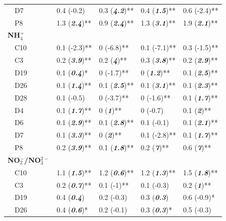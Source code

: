 \documentclass[journal = esthag, manuscript = article]{achemso}\usepackage[]{graphicx}\usepackage[]{color}
\begin{document}
\begin{table}[!tbp]
\begin{center}
\begin{tabular}{lllll}
~~D7&0.4 \footnotesize{(-0.2)}&0.3 \footnotesize{(\textit{\textbf{4.2}})**}&0.4 \footnotesize{(\textit{\textbf{1.5}})**}&0.6 \footnotesize{(-2.4)**}\tabularnewline
~~P8&1.3 \footnotesize{(\textit{\textbf{2.4}})**}&0.9 \footnotesize{(\textit{\textbf{2.4}})**}&1.3 \footnotesize{(\textit{\textbf{3.1}})**}&1.9 \footnotesize{(\textit{\textbf{2.1}})**}\tabularnewline
\hline
{\bfseries NH$_{4}^{+}$}&&&&\tabularnewline
~~C10&0.1 \footnotesize{(-2.3)**}&0 \footnotesize{(-6.8)**}&0.1 \footnotesize{(-7.1)**}&0.3 \footnotesize{(-1.5)**}\tabularnewline
~~C3&0.2 \footnotesize{(\textit{\textbf{3.9}})**}&0.2 \footnotesize{(\textit{\textbf{4}})**}&0.3 \footnotesize{(\textit{\textbf{3.8}})**}&0.2 \footnotesize{(\textit{\textbf{2.9}})**}\tabularnewline
~~D19&0.1 \footnotesize{(\textit{\textbf{0.4}})*}&0 \footnotesize{(-1.7)**}&0 \footnotesize{(\textit{\textbf{1.2}})**}&0.1 \footnotesize{(\textit{\textbf{2.5}})**}\tabularnewline
~~D26&0.1 \footnotesize{(\textit{\textbf{1.4}})**}&0.1 \footnotesize{(\textit{\textbf{2.5}})**}&0.1 \footnotesize{(\textit{\textbf{3.1}})**}&0.1 \footnotesize{(\textit{\textbf{2.3}})**}\tabularnewline
~~D28&0.1 \footnotesize{(-0.5)}&0 \footnotesize{(-3.7)**}&0 \footnotesize{(-1.6)**}&0.1 \footnotesize{(\textit{\textbf{1.7}})**}\tabularnewline
~~D4&0.1 \footnotesize{(\textit{\textbf{1.7}})**}&0 \footnotesize{(\textit{\textbf{1}})**}&0 \footnotesize{(-0.7)}&0.1 \footnotesize{(\textit{\textbf{2}})**}\tabularnewline
~~D6&0.1 \footnotesize{(\textit{\textbf{2.9}})**}&0.1 \footnotesize{(\textit{\textbf{2.8}})**}&0.1 \footnotesize{(-0.1)}&0.1 \footnotesize{(\textit{\textbf{2.1}})**}\tabularnewline
~~D7&0.1 \footnotesize{(\textit{\textbf{3.3}})**}&0 \footnotesize{(\textit{\textbf{2}})**}&0.1 \footnotesize{(-2.8)**}&0.1 \footnotesize{(\textit{\textbf{1.7}})**}\tabularnewline
~~P8&0.2 \footnotesize{(\textit{\textbf{3.9}})**}&0.1 \footnotesize{(\textit{\textbf{1.8}})**}&0.2 \footnotesize{(\textit{\textbf{7}})**}&0.6 \footnotesize{(\textit{\textbf{7}})**}\tabularnewline
\hline
{\bfseries NO$_{2}^{-}$/NO$_{3}^{2-}$}&&&&\tabularnewline
~~C10&1.1 \footnotesize{(\textit{\textbf{1.5}})**}&1.2 \footnotesize{(\textit{\textbf{0.6}})**}&1.2 \footnotesize{(\textit{\textbf{1.3}})**}&1.5 \footnotesize{(\textit{\textbf{1.8}})**}\tabularnewline
~~C3&0.2 \footnotesize{(\textit{\textbf{0.7}})**}&0.1 \footnotesize{(-1)**}&0.1 \footnotesize{(-0.3)}&0.2 \footnotesize{(\textit{\textbf{1}})**}\tabularnewline
~~D19&0.4 \footnotesize{(\textit{\textbf{0.4}})}&0.2 \footnotesize{(-0.3)}&0.3 \footnotesize{(\textit{\textbf{0.3}})}&0.6 \footnotesize{(-0.9)*}\tabularnewline
~~D26&0.4 \footnotesize{(\textit{\textbf{0.6}})*}&0.2 \footnotesize{(-0.1)}&0.3 \footnotesize{(\textit{\textbf{0.3}})*}&0.5 \footnotesize{(-0.3)}\tabularnewline

\end{tabular}
\end{center}
\end{table}
\end{document}
